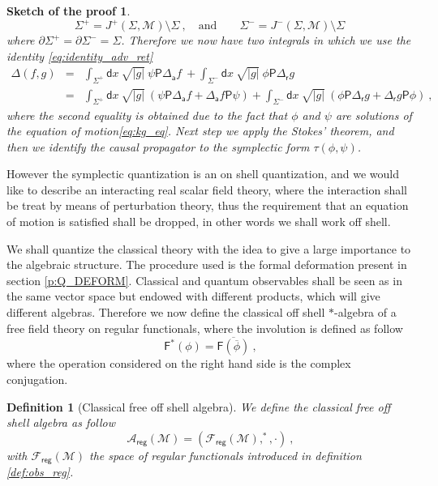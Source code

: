 \documentclass[11pt]{book}
\newcommand{\reg}{\mathsf{reg}}
\newcommand{\abs}[1]{\left|#1\right|}
\newcommand{\Acal}{\mathcal{A}}
\newcommand{\Fcal}{\mathcal{F}}
\newcommand{\Mcal}{\mathcal{M}}
\newcommand{\Fsf}{\mathsf{F}}
\newcommand{\Psf}{\mathsf{P}}
\newcommand{\asf}{\mathsf{a}}
\newcommand{\dsf}{\mathsf{d}}
\newcommand{\rsf}{\mathsf{r}}
\theoremstyle{break}
\newtheorem{definition}{Definition}[chapter]
\newtheorem*{sketch}{Sketch of the proof}[chapter]
\begin{document}
\begin{sketch}
%
\begin{equation*}
\Sigma^+ = J^+(\Sigma,\Mcal) \setminus \Sigma \ , \quad \mbox{and} \qquad \Sigma^- = J^-(\Sigma,\Mcal) \setminus \Sigma \ 
\end{equation*}
%
where $\partial \Sigma^+ = \partial \Sigma^- = \Sigma$. 
Therefore we now have  two integrals in which we use the identity \eqref{eq:identity_adv_ret}
%
\begin{eqnarray*}
\Delta(f,g) &=& \int_{\Sigma^+} \dsf x \ \sqrt{\abs{g}} \ \psi \Psf \Delta_\asf f \ + \int_{\Sigma^-} \dsf x \ \sqrt{\abs{g}} \ \phi \Psf \Delta_\rsf g \\
%
&=& 
\int_{\Sigma^+} \dsf x \ \sqrt{\abs{g}} \ 
\left( \psi \Psf \Delta_\asf f + \Delta_\asf f \Psf \psi \right) 
+ 
\int_{\Sigma^-} \dsf x \ \sqrt{\abs{g}} \ 
\left( \phi \Psf \Delta_\rsf g + \Delta_\rsf g \Psf \phi \right) \ ,
\end{eqnarray*}
%
where the second equality is obtained due to the fact that $\phi$ and $\psi$ are solutions of the equation of motion\eqref{eq:kg_eq}. Next step we apply the Stokes' theorem, and then we identify the causal propagator to the symplectic form $\tau(\phi,\psi)$.
\end{sketch}


However the symplectic quantization is an on shell quantization, and we would like to describe an interacting real scalar field theory, where the interaction shall be treat by means of perturbation theory, thus the requirement that an equation of motion is satisfied shall be dropped, in other words we shall work off shell. 


We shall quantize the classical theory with the idea to give a large importance to the algebraic structure. The procedure used is the formal deformation present in section \ref{p:Q_DEFORM}. Classical and quantum observables shall be seen as in the same vector space but endowed with different products, which will give different algebras. Therefore we now define the classical off shell $\ast$-algebra of a free field theory on regular functionals, where the involution is defined as follow
%
\begin{equation}
\Fsf^\ast(\phi) =  \overline{\Fsf(\overline{\phi})} \ , 
\label{eq:involution}
\end{equation}
%
where the operation considered on the right hand side is the complex conjugation. 


\begin{definition}[Classical free off shell algebra]\label{def:alg_clas}
We define the classical free off shell algebra as follow
%
\begin{equation}
\Acal_\reg(\Mcal) = \left(\Fcal_\reg(\Mcal), ^\ast , \cdot\right) \ ,
\label{eq:alg_clas}
\end{equation}
%
with $\Fcal_\reg(\Mcal)$ the space of regular functionals introduced in definition \ref{def:obs_reg}.
\end{definition}
\end{document}
